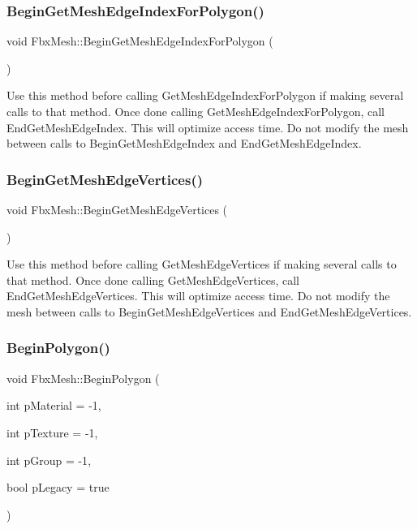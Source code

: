 \subsubsection{\texorpdfstring{Begin\+Get\+Mesh\+Edge\+Index\+For\+Polygon()}{BeginGetMeshEdgeIndexForPolygon()}}
{\footnotesize\ttfamily void Fbx\+Mesh\+::\+Begin\+Get\+Mesh\+Edge\+Index\+For\+Polygon (\begin{DoxyParamCaption}{ }\end{DoxyParamCaption})}

Use this method before calling Get\+Mesh\+Edge\+Index\+For\+Polygon if making several calls to that method. Once done calling Get\+Mesh\+Edge\+Index\+For\+Polygon, call End\+Get\+Mesh\+Edge\+Index. This will optimize access time. Do not modify the mesh between calls to Begin\+Get\+Mesh\+Edge\+Index and End\+Get\+Mesh\+Edge\+Index. \mbox{\label{class_fbx_mesh_a7eed368fb6a1e11dc2b1e69271e46252}} 
\subsubsection{\texorpdfstring{Begin\+Get\+Mesh\+Edge\+Vertices()}{BeginGetMeshEdgeVertices()}}
{\footnotesize\ttfamily void Fbx\+Mesh\+::\+Begin\+Get\+Mesh\+Edge\+Vertices (\begin{DoxyParamCaption}{ }\end{DoxyParamCaption})}

Use this method before calling Get\+Mesh\+Edge\+Vertices if making several calls to that method. Once done calling Get\+Mesh\+Edge\+Vertices, call End\+Get\+Mesh\+Edge\+Vertices. This will optimize access time. Do not modify the mesh between calls to Begin\+Get\+Mesh\+Edge\+Vertices and End\+Get\+Mesh\+Edge\+Vertices. \mbox{\label{class_fbx_mesh_aebaf7be01966e5a365a0bc49b8d15b3b}} 
\subsubsection{\texorpdfstring{Begin\+Polygon()}{BeginPolygon()}}
{\footnotesize\ttfamily void Fbx\+Mesh\+::\+Begin\+Polygon (\begin{DoxyParamCaption}\item[{int}]{p\+Material = {\ttfamily -\/1},  }\item[{int}]{p\+Texture = {\ttfamily -\/1},  }\item[{int}]{p\+Group = {\ttfamily -\/1},  }\item[{bool}]{p\+Legacy = {\ttfamily true} }\end{DoxyParamCaption})}

